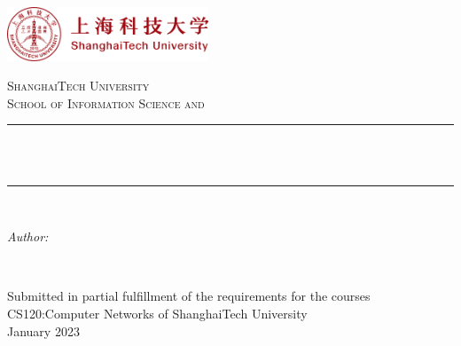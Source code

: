 \begin{titlepage}

  \newcommand{\HRule}{\rule{\linewidth}{0.5mm}} %



  \includegraphics[width = 6cm]{./figures/shanghaitech}\\[0.5cm]

  \center %


  \textsc{\Large ShanghaiTech University}\\[0.5cm]
  \textsc{\large School of Information Science and}\\[0.5cm]


  \HRule \\[0.4cm]
  { \huge \bfseries \reporttitle}\\ %
  \HRule \\[1.5cm]


  \begin{minipage}{0.4\textwidth}
    \begin{flushleft} \large
      \emph{Author:}\\
      \reportauthor %
    \end{flushleft}
  \end{minipage}
  ~



  \vfill %
  Submitted in partial fulfillment of the requirements for the courses CS120:Computer Networks of ShanghaiTech University\\[0.5cm]

  \makeatletter
  January 2023
  \makeatother


\end{titlepage}
